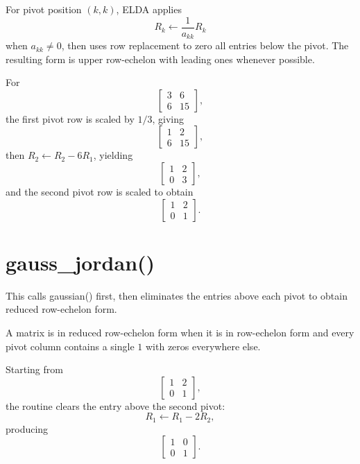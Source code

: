 \documentclass[11pt,a4paper,openany]{book}
\def\code#1{#1}%
\DeclareRobustCommand{\code}[1]{\texttt{\detokenize{#1}}}
\begin{document}
\begin{mathbox}
For pivot position \((k,k)\), ELDA applies
\[
R_k \leftarrow \frac{1}{a_{kk}}R_k
\]
when \(a_{kk} \neq 0\), then uses row replacement to zero all entries below the pivot. The resulting form is upper row-echelon with leading ones whenever possible.
\end{mathbox}

\begin{examplebox}[Example]
For
\[
\begin{bmatrix}
3 & 6 \\
6 & 15
\end{bmatrix},
\]
the first pivot row is scaled by \(1/3\), giving
\[
\begin{bmatrix}
1 & 2 \\
6 & 15
\end{bmatrix},
\]
then \(R_2 \leftarrow R_2 - 6R_1\), yielding
\[
\begin{bmatrix}
1 & 2 \\
0 & 3
\end{bmatrix},
\]
and the second pivot row is scaled to obtain
\[
\begin{bmatrix}
1 & 2 \\
0 & 1
\end{bmatrix}.
\]
\end{examplebox}

\section{\code{gauss_jordan()}}
This calls \code{gaussian()} first, then eliminates the entries above each pivot to obtain reduced row-echelon form.

\begin{mathbox}
A matrix is in reduced row-echelon form when it is in row-echelon form and every pivot column contains a single \(1\) with zeros everywhere else.
\end{mathbox}

\begin{examplebox}[Example]
Starting from
\[
\begin{bmatrix}
1 & 2 \\
0 & 1
\end{bmatrix},
\]
the routine clears the entry above the second pivot:
\[
R_1 \leftarrow R_1 - 2R_2,
\]
producing
\[
\begin{bmatrix}
1 & 0 \\
0 & 1
\end{bmatrix}.
\]
\end{examplebox}
\end{document}
